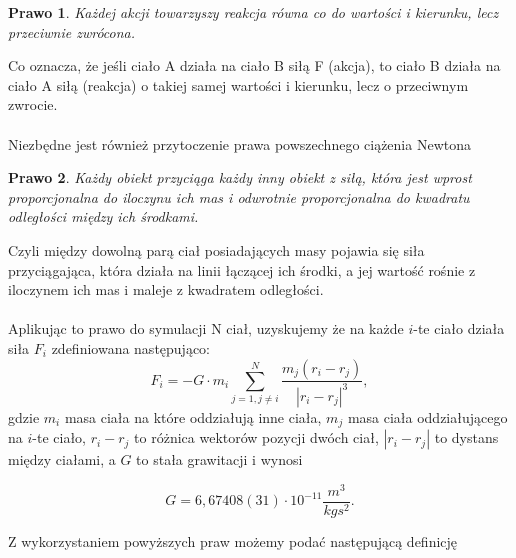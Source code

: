 \documentclass[14pt,twoside,a4paper]{article}
\newtheorem{theorem}{Prawo}
\theoremstyle{definition}
\begin{document}
\begin{theorem}
Każdej akcji towarzyszy reakcja równa co do wartości i kierunku, lecz przeciwnie zwrócona.
\end{theorem} 
Co oznacza, że jeśli ciało A działa na ciało B siłą F (akcja), to ciało B działa na ciało A siłą (reakcja) o takiej samej wartości i kierunku, lecz o przeciwnym zwrocie.\\~\\


Niezbędne jest również przytoczenie prawa powszechnego ciążenia Newtona \cite[str.~4-5]{fund}
\begin{theorem}
Każdy obiekt przyciąga każdy inny obiekt z siłą, która jest wprost proporcjonalna do iloczynu ich mas i odwrotnie proporcjonalna do kwadratu odległości między ich środkami.
\end{theorem}
Czyli między dowolną parą ciał posiadających masy pojawia się siła przyciągająca, która działa na linii łączącej ich środki, a jej wartość rośnie z iloczynem ich mas i maleje z kwadratem odległości.\\~\\

Aplikując to prawo do symulacji N ciał, uzyskujemy że na każde $i$-te ciało działa siła $F_i$ zdefiniowana następująco:\\
$$F_i = -G\cdot m_i \sum_{j=1, j\neq i}^N \frac{m_j(r_i - r_j)}{|r_i - r_j|^3},$$gdzie $m_i$ masa ciała na które oddziałują inne ciała, $m_j$ masa ciała oddziałującego na $i$-te ciało, $r_i - r_j$ to różnica wektorów pozycji dwóch ciał, $|r_i - r_j|$ to dystans między ciałami, a $G$ to stała grawitacji i wynosi
\begin{center}
$$G = 6,67408(31)\cdot 10^{-11} \frac{m^{3}}{kg s^2}.$$
\end{center}
Z wykorzystaniem powyższych praw możemy podać następującą definicję
\end{document}

